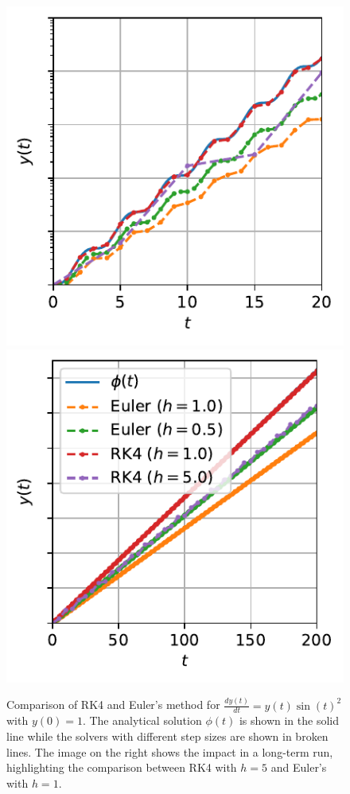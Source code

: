 \begin{figure}[h]
    \centering
    \includegraphics{images/ode_solver_comparison_zoom.pdf}
    \includegraphics{images/ode_solver_comparison.pdf}
    \caption{Comparison of RK4 and Euler's method for $\frac{d y\left( t \right) }{dt} = y(t)\sin(t)^2$ with $y(0)=1$. The analytical solution $\phi(t)$ is shown in the solid line while the solvers with different step sizes are shown in broken lines. The image on the right shows the impact in a long-term run, highlighting the comparison between RK4 with $h=5$ and Euler's with $h=1$.}
    \label{fig:ode_comparison}
\end{figure}

